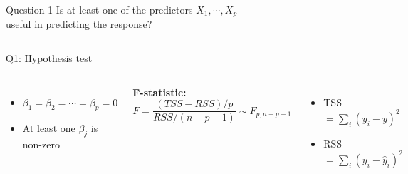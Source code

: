 \documentclass[aspectratio=169,usenames,dvipsnames]{beamer}
\newcommand{\InstructorList}[1]{
\begin{itemize}
	\color{orange}
	#1
\end{itemize}
}
\begin{document}
\begin{frame}

\begin{columns}
\centering
\begin{block}
	{Question 1}
	\centering 
Is at least one of the predictors $X_1, \cdots, X_p$ \\
useful in predicting the response?
\end{block}

\end{columns}

\end{frame}
\begin{frame}[t]{Q1: Hypothesis test}

\begin{columns}
\centering
\begin{itemize}
	\item [$H_0 : $] $\beta_1 = \beta_2 = \cdots = \beta_p = 0$
	\item [$H_a:$] At least one $\beta_j$ is non-zero
\end{itemize}

\centering

\textbf{F-statistic:}
\begin{equation*}
	F = \frac{(TSS-RSS)/p}{RSS/(n-p-1)} \sim F_{p,n- p - 1}
\end{equation*}

\InstructorList{
\item TSS $= \sum_i (y_i - \overline y)^2$
\item RSS $= \sum_i (y_i - \hat y_i)^2$
}

\end{columns}

\end{frame}
\end{document}
